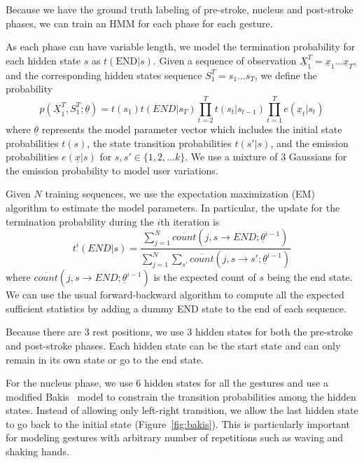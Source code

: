 \documentclass{acm_proc_article-sp}
\begin{document}
Because we have the ground truth labeling of pre-stroke, nucleus and post-stroke phases, 
we can train an HMM for each phase for each gesture. 

As each phase can have variable length, we model the termination probability for each
hidden state $s$ as $t(\text{END}|s)$. Given a sequence of observation $\underline{X}_1^T = \underline{x}_1\ldots\underline{x}_T$, and 
the corresponding hidden states sequence $S_1^T = s_1\ldots s_T$, we define the probability
\begin{displaymath}
p(\underline{X}_1^T, S_1^T;\underline{\theta}) = 
    t(s_1)t(END|s_T)\prod_{t = 2}^T t(s_t | s_{t-1})\prod_{t = 1}^T e(\underline{x}_t|s_t)
\end{displaymath}
where $\underline{\theta}$ represents the model parameter vector which includes
the initial state probabilities $t(s)$, the state transition probabilities $t(s'|s)$, and the 
emission probabilities $e(\underline{x}|s)$ for $s, s'\in \{1, 2,\ldots k\}$. We use a mixture of 3 Gaussians for the emission probability to model user variations.

Given $N$ training sequences, we use the expectation maximization (EM) algorithm to estimate the model parameters. In
particular, the update for the termination probability during the $i$th iteration is 
\begin{displaymath}
t^i(END|s) = \frac{\sum_{j = 1}^N \overline{count}(j, s\rightarrow END;\underline{\theta}^{i-1})}
    {\sum_{j = 1}^N\sum_{s'} \overline{count}(j, s\rightarrow s';\underline{\theta}^{i-1})}
\end{displaymath}
where $\overline{count}(j, s\rightarrow END;\underline{\theta}^{i-1})$ is the expected count of 
$s$ being the end state. We can use the usual forward-backward algorithm to compute all the 
expected sufficient statistics by adding a dummy END state to the end of each sequence.

Because there are 3 rest positions, we use 3 hidden states for both the pre-stroke and post-stroke phases.
Each hidden state can be the start state and can only remain in its own state or go to the end state.
 
For the nucleus phase, we use 6 hidden states for all the gestures and use a modified Bakis~\cite{bauer2000} model to constrain the transition probabilities
among the hidden states. Instead of allowing only left-right transition, we allow the last hidden state
to go back to the initial state (Figure~\ref{fig:bakis}). This is particularly important for modeling gestures with arbitrary number of
repetitions such as waving and shaking hands. 
\end{document}
